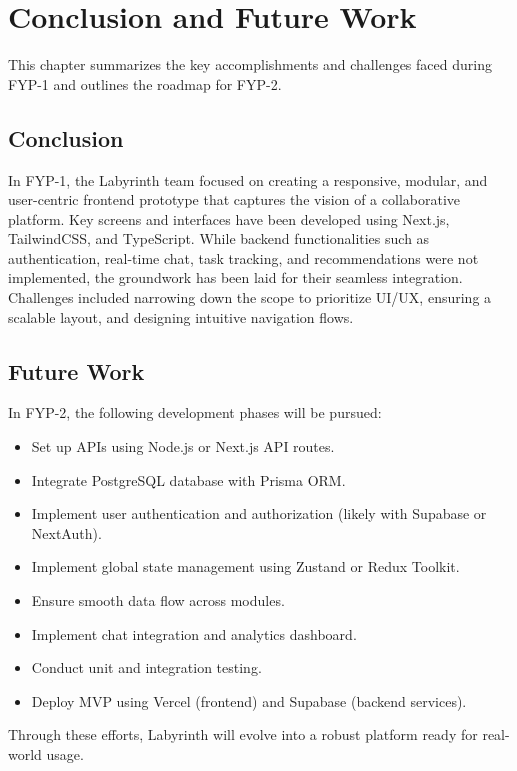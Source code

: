 \documentclass{FastFyp}
\begin{document}
\chapter{Conclusion and Future Work}
This chapter summarizes the key accomplishments and challenges faced during FYP-1 and outlines the roadmap for FYP-2. 

\section{Conclusion}
In FYP-1, the Labyrinth team focused on creating a responsive, modular, and user-centric frontend prototype that captures the vision of a collaborative platform. Key screens and interfaces have been developed using Next.js, TailwindCSS, and TypeScript. While backend functionalities such as authentication, real-time chat, task tracking, and recommendations were not implemented, the groundwork has been laid for their seamless integration. Challenges included narrowing down the scope to prioritize UI/UX, ensuring a scalable layout, and designing intuitive navigation flows.
\section{Future Work}
In FYP-2, the following development phases will be pursued:
\begin{itemize}
    \item Set up APIs using Node.js or Next.js API routes.
    \item Integrate PostgreSQL database with Prisma ORM.
    \item Implement user authentication and authorization (likely with Supabase or NextAuth).
    \item Implement global state management using Zustand or Redux Toolkit.
    \item Ensure smooth data flow across modules.
    \item Implement chat integration and analytics dashboard.
    \item Conduct unit and integration testing.
    \item Deploy MVP using Vercel (frontend) and Supabase (backend services).
\end{itemize}
Through these efforts, Labyrinth will evolve into a robust platform ready for real-world usage.
{

}
\end{document}
